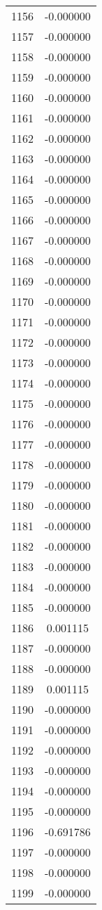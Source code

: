 \documentclass[12pt]{article}
\begin{document}
\begin{longtable}{@{}cc@{}}
1156 & -0.000000 \\
1157 & -0.000000 \\
1158 & -0.000000 \\
1159 & -0.000000 \\
1160 & -0.000000 \\
1161 & -0.000000 \\
1162 & -0.000000 \\
1163 & -0.000000 \\
1164 & -0.000000 \\
1165 & -0.000000 \\
1166 & -0.000000 \\
1167 & -0.000000 \\
1168 & -0.000000 \\
1169 & -0.000000 \\
1170 & -0.000000 \\
1171 & -0.000000 \\
1172 & -0.000000 \\
1173 & -0.000000 \\
1174 & -0.000000 \\
1175 & -0.000000 \\
1176 & -0.000000 \\
1177 & -0.000000 \\
1178 & -0.000000 \\
1179 & -0.000000 \\
1180 & -0.000000 \\
1181 & -0.000000 \\
1182 & -0.000000 \\
1183 & -0.000000 \\
1184 & -0.000000 \\
1185 & -0.000000 \\
1186 & 0.001115 \\
1187 & -0.000000 \\
1188 & -0.000000 \\
1189 & 0.001115 \\
1190 & -0.000000 \\
1191 & -0.000000 \\
1192 & -0.000000 \\
1193 & -0.000000 \\
1194 & -0.000000 \\
1195 & -0.000000 \\
1196 & -0.691786 \\
1197 & -0.000000 \\
1198 & -0.000000 \\
1199 & -0.000000 \\

\end{longtable}
\end{document}
